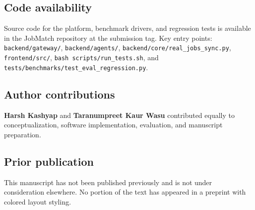 \subsection*{Code availability}
Source code for the platform, benchmark drivers, and regression tests is available in the JobMatch repository at the submission tag.
Key entry points: \texttt{backend/gateway/}, \texttt{backend/agents/}, \texttt{backend/core/real\_jobs\_sync.py}, \texttt{frontend/src/}, \texttt{bash scripts/run\_tests.sh}, and \texttt{tests/benchmarks/test\_eval\_regression.py}.

\subsection*{Author contributions}
\textbf{Harsh Kashyap} and \textbf{Taranumpreet Kaur Wasu} contributed equally to conceptualization, software implementation, evaluation, and manuscript preparation.

\subsection*{Prior publication}
This manuscript has not been published previously and is not under consideration elsewhere.
No portion of the text has appeared in a preprint with colored layout styling.

